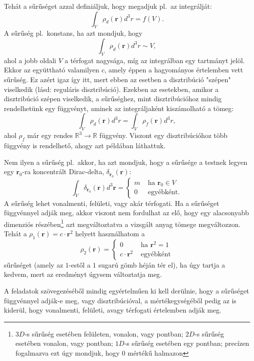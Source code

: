 \documentclass[12pt,a4paper]{scrartcl}
\let\mathbf\bm
\begin{document}
Tehát a sűrűséget azzal definiáljuk, hogy megadjuk pl.\ az integrálját:
\[\int_V {{\rho _d}\left( {\mathbf{r}} \right){d^3}r}  = f\left( V \right).\]
A sűrűség pl.\ konstans, ha azt mondjuk, hogy
\[\int_V {{\rho _d}\left( {\mathbf{r}} \right){d^3}r} \sim V,\]
ahol a jobb oldali $V$ a térfogat nagysága, míg az integrálban egy tartmányt jelöl. Ekkor az együttható valamilyen $c$, amely éppen a hagyományos értelemben vett sűrűség. Ez azért igaz így itt, mert ebben az esetben a disztribúció "szépen" viselkedik (lásd: reguláris disztribúció). Ezekben az esetekben, amikor a disztribúció szépen viselkedik, a sűrűséghez, mint disztribúcióhoz mindig rendelhetünk egy függvényt, aminek az integráljaként kiszámolható a tömeg:
\[\int_V {{\rho _d}\left( {\mathbf{r}} \right){d^3}r}  = \int_V {{\rho _f}\left( {\mathbf{r}} \right){d^3}r} ,\]
ahol $\rho _f$ már egy rendes ${\mathbb{R}^3} \to \mathbb{R}$ függvény. Viszont egy disztribúcióhoz több függvény is rendelhető, ahogy azt \az{\eqref{eq:ugyanaz_a_tomeg}} példában láthattuk.

Nem ilyen a sűrűség pl.\ akkor, ha azt mondjuk, hogy a sűrűsége a testnek legyen egy ${{\mathbf{r}}_0}$-ra koncentrált Dirac-delta, $\delta_{{{\mathbf{r}}_0}} \left( {\mathbf{r}} \right)$:
\[\int_V {{\delta _{{{\mathbf{r}}_0}}}\left( {\mathbf{r}} \right)} {d^3}{\mathbf{r}} = \left\{ \begin{array}{lr}
  m&{\text{ ha }}{{\mathbf{r}}_0} \in V \\ 
  0&{\text{ egyébként.}}
\end{array} \right.\]
A sűrűség lehet vonalmenti, felületi, vagy akár térfogati. Ha a sűrűséget függvénnyel adják meg, akkor viszont nem fordulhat az elő, hogy egy alacsonyabb dimenziós részében\footnote{$3D$-s sűrűség esetében felületen, vonalon, vagy pontban; $2D$-s sűrűség esetében vonalon, vagy pontban; $1D$-s sűrűség esetében egy pontban; precízen fogalmazva ezt úgy mondjuk, hogy 0 mértékű halmazon} azt megváltoztatva a vizsgált anyag tömege megváltozzon. Tehát a ${\rho _1}\left( {\mathbf{r}} \right) = c\cdot {{\mathbf{r}}^2}$ helyett használhatom a 
\[{\rho _2}\left( {\mathbf{r}} \right) = \left\{ \begin{array}{lr}
  0&{\text{ ha }}{{\mathbf{r}}^2} = 1 \\
  c \cdot {{\mathbf{r}}^2}&{\text{ egyébként}}
\end{array} \right.\]
sűrűséget (amely az $1$-estől a $1$ sugarú gömb héján tér el), ha úgy tartja a kedvem, mert az eredményt úgysem változtatja meg.

A feladatok szövegezéséből mindig egyértelműen ki kell derülnie, hogy a sűrűséget függvénnyel adják-e meg, vagy disztribúcióval, a mértékegységéből pedig az is kiderül, hogy vonalmenti, felületi, avagy térfogati értelemben adják meg.
\end{document}

